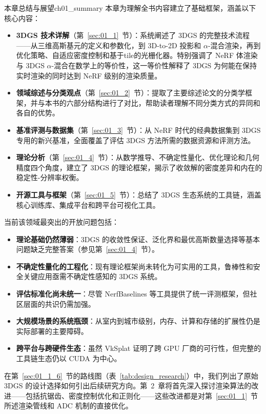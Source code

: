 \begin{futurebox}{本章总结与展望}{ch01_summary}
本章为理解全书内容建立了基础框架，涵盖以下核心内容：
\begin{itemize}
\item \textbf{3DGS 技术详解}（第~\ref{sec:01_1}~节）：系统阐述了 3DGS 的完整技术流程——从三维高斯基元的定义和参数化，到 3D-to-2D 投影和 $\alpha$-混合渲染，再到优化策略、自适应密度控制和基于tile的光栅化器。特别强调了 NeRF 体渲染与 3DGS $\alpha$-混合在数学上的等价性，这一等价性解释了 3DGS 为何能在保持实时渲染的同时达到 NeRF 级别的渲染质量。
\item \textbf{领域综述与分类观点}（第~\ref{sec:01_2}~节）：提取了主要综述论文的分类学框架，并与本书的六部分结构进行了对比，帮助读者理解不同分类方式的异同和各自的优势。
\item \textbf{基准评测与数据集}（第~\ref{sec:01_3}~节）：从 NeRF 时代的经典数据集到 3DGS 专用的新兴基准，全面覆盖了评估 3DGS 方法所需的数据资源和评测方法。
\item \textbf{理论分析}（第~\ref{sec:01_4}~节）：从数学推导、不确定性量化、优化理论和几何精度四个角度，建立了 3DGS 的理论框架，揭示了收敛解的密度差异和内在的稳定性-分辨率权衡。
\item \textbf{开源工具与框架}（第~\ref{sec:01_5}~节）：总结了 3DGS 生态系统的工具链，涵盖核心训练库、集成平台和跨平台可视化工具。
\end{itemize}

当前该领域最突出的开放问题包括：
\begin{itemize}
\item \textbf{理论基础仍然薄弱}：3DGS 的收敛性保证、泛化界和最优高斯数量选择等基本问题缺乏完整答案（参见第~\ref{sec:01_4}~节）。
\item \textbf{不确定性量化的工程化}：现有理论框架尚未转化为可实用的工具，鲁棒性和安全关键应用亟需不确定性感知的 3DGS 系统。
\item \textbf{评估标准化尚未统一}：尽管 NerfBaselines 等工具提供了统一评测框架，但社区层面的共识仍需加强。
\item \textbf{大规模场景的系统瓶颈}：从室内到城市级别，内存、计算和存储的扩展性仍是实际部署的主要障碍。
\item \textbf{跨平台与跨硬件生态}：虽然 VkSplat 证明了跨 GPU 厂商的可行性，但完整的工具链生态仍以 CUDA 为中心。
\end{itemize}

在第~\ref{sec:01_1_6}~节的路线图（表~\ref{tab:design_research}）中，我们列出了原始 3DGS 的设计选择如何引出后续研究方向。第~2~章将首先深入探讨渲染算法的改进——包括抗锯齿、密度控制优化和正则化——这些改进都是对第~\ref{sec:01_1}~节所述渲染管线和 ADC 机制的直接优化。
\end{futurebox}
